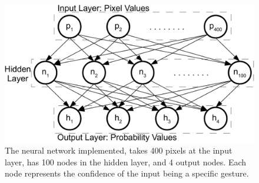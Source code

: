 \begin{figure}
\centering
\includegraphics[width=\columnwidth]{ch5/figs/neural_net-crop.pdf}
\caption{The neural network implemented, takes 400 pixels at the input layer,
has 100 nodes in the hidden layer, and 4 output nodes. Each node represents
the confidence of the input being a specific gesture.}
\label{neural_net}
\end{figure}

